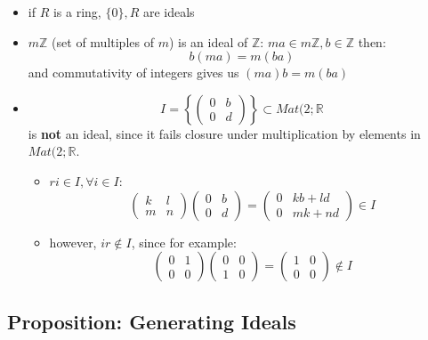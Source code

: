 \documentclass{exam}
\begin{document}
\begin{itemize}
    \item if $R$ is a ring, $\{0\}, R$ are ideals
    \item $m\mathbb{Z}$ (set of multiples of $m$) is an ideal of $\mathbb{Z}$: $ma \in m\mathbb{Z}, b \in \mathbb{Z}$ then:
    \[
    b(ma) = m(ba)
    \]
    and commutativity of integers gives us $(ma)b = m(ba)$
    \item 
    \[
    I = \left\{\begin{pmatrix}
    0 & b \\
    0 & d
    \end{pmatrix}\right\} \subset Mat(2; \mathbb{R}
    \]
    is \textbf{not} an ideal, since it fails closure under multiplication by elements in $Mat(2; \mathbb{R}$.
    \begin{itemize}
        \item $ri \in I, \forall i \in I$:
        \[
        \begin{pmatrix}
        k & l \\
        m & n
        \end{pmatrix}
        \begin{pmatrix}
        0 & b \\
        0 & d
        \end{pmatrix}
        =
        \begin{pmatrix}
        0 & kb + ld \\
        0 & mk + nd
        \end{pmatrix}
        \in I
        \]
        \item however, $ir \not\in I$, since for example:
        \[
        \begin{pmatrix}
        0 & 1 \\
        0 & 0
        \end{pmatrix}
        \begin{pmatrix}
        0 & 0 \\
        1 & 0
        \end{pmatrix}
        =
        \begin{pmatrix}
        1 & 0 \\
        0 & 0
        \end{pmatrix}
        \not\in I
        \]
    \end{itemize}
\end{itemize}

\subsection{Proposition: Generating Ideals}
\end{document}
